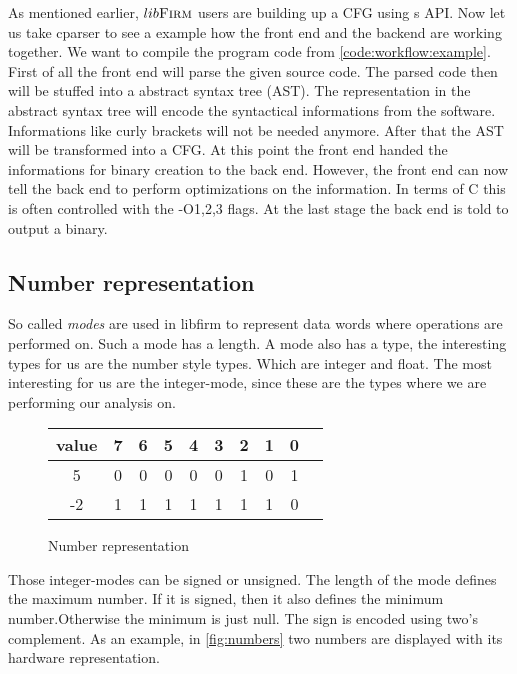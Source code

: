As mentioned earlier, $lib\textsc{Firm}$ users are building up a CFG using \libFIRM s API.
Now let us take cparser to see a example how the front end and the backend are working together. We want to compile the program code from \ref{code:workflow:example}.  \newline
First of all the front end will parse the given source code. The parsed code then will be stuffed into a abstract syntax tree (AST). The representation in the abstract syntax tree will encode the syntactical informations from the software. Informations like curly brackets will not be needed anymore. \newline
After that the AST will be transformed into a CFG. \newline
At this point the front end handed the informations for binary creation to the back end. However, the front end can now tell the back end to perform optimizations on the information. In terms of C this is often controlled with the -O{1,2,3} flags. \newline
At the last stage the back end is told to output a binary.

\subsection{Number representation}
So called \textit{modes} are used in libfirm to represent data words where operations are performed on. Such a mode has a length. A mode also has a type, the interesting types for us are the number style types. Which are integer and float. The most interesting for us are the integer-mode, since these are the types where we are performing our analysis on.

\begin{figure}
	\centering
	\begin{tabular}{c | c c c c c c c c c}
		value & 7 & 6 & 5 & 4 & 3 & 2 & 1 & 0 \\
		\hline
		5     & 0 & 0 & 0 & 0 & 0 & 1 & 0 & 1 \\
		-2    & 1 & 1 & 1 & 1 & 1 & 1 & 1 & 0 \\
	\end{tabular}
	\caption{Number representation}
	\label{fig:numbers}
\end{figure}

Those integer-modes can be signed or unsigned. The length of the mode defines the maximum number. If it is signed, then it also defines the minimum number.Otherwise the minimum is just null. The sign is encoded using two's complement. As an example, in \autoref{fig:numbers} two numbers are displayed with its hardware representation.

